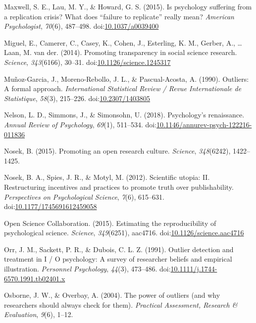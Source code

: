 \documentclass[english,,man,mask]{apa6}
\theoremstyle{definition}
\theoremstyle{definition}
\theoremstyle{definition}
\theoremstyle{remark}
\begin{document}
\hypertarget{ref-Maxwell2015}{}
Maxwell, S. E., Lau, M. Y., \& Howard, G. S. (2015). Is psychology
suffering from a replication crisis? What does ``failure to replicate''
really mean? \emph{American Psychologist}, \emph{70}(6), 487--498.
doi:\href{https://doi.org/10.1037/a0039400}{10.1037/a0039400}

\hypertarget{ref-Miguel2014}{}
Miguel, E., Camerer, C., Casey, K., Cohen, J., Esterling, K. M., Gerber,
A., \ldots{} Laan, M. van der. (2014). Promoting transparency in social
science research. \emph{Science}, \emph{343}(6166), 30--31.
doi:\href{https://doi.org/10.1126/science.1245317}{10.1126/science.1245317}

\hypertarget{ref-Munoz-Garcia1990}{}
Muñoz-Garcia, J., Moreno-Rebollo, J. L., \& Pascual-Acosta, A. (1990).
Outliers: A formal approach. \emph{International Statistical Review /
Revue Internationale de Statistique}, \emph{58}(3), 215--226.
doi:\href{https://doi.org/10.2307/1403805}{10.2307/1403805}

\hypertarget{ref-Nelson2018}{}
Nelson, L. D., Simmons, J., \& Simonsohn, U. (2018). Psychology's
renaissance. \emph{Annual Review of Psychology}, \emph{69}(1), 511--534.
doi:\href{https://doi.org/10.1146/annurev-psych-122216-011836}{10.1146/annurev-psych-122216-011836}

\hypertarget{ref-Nosek2015b}{}
Nosek, B. (2015). Promoting an open research culture. \emph{Science},
\emph{348}(6242), 1422--1425.

\hypertarget{ref-Nosek2012c}{}
Nosek, B. A., Spies, J. R., \& Motyl, M. (2012). Scientific utopia: II.
Restructuring incentives and practices to promote truth over
publishability. \emph{Perspectives on Psychological Science},
\emph{7}(6), 615--631.
doi:\href{https://doi.org/10.1177/1745691612459058}{10.1177/1745691612459058}

\hypertarget{ref-ScienceCollaboration2015}{}
Open Science Collaboration. (2015). Estimating the reproducibility of
psychological science. \emph{Science}, \emph{349}(6251), aac4716.
doi:\href{https://doi.org/10.1126/science.aac4716}{10.1126/science.aac4716}

\hypertarget{ref-Orr1991}{}
Orr, J. M., Sackett, P. R., \& Dubois, C. L. Z. (1991). Outlier
detection and treatment in I / O psychology: A survey of researcher
beliefs and empirical illustration. \emph{Personnel Psychology},
\emph{44}(3), 473--486.
doi:\href{https://doi.org/10.1111/j.1744-6570.1991.tb02401.x}{10.1111/j.1744-6570.1991.tb02401.x}

\hypertarget{ref-Osborne2004}{}
Osborne, J. W., \& Overbay, A. (2004). The power of outliers (and why
researchers should always check for them). \emph{Practical Assessment,
Research \& Evaluation}, \emph{9}(6), 1--12.
\end{document}
